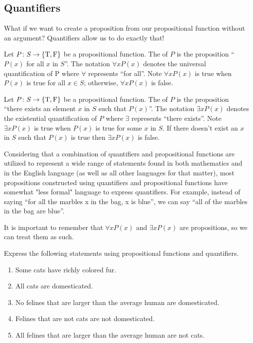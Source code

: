 \documentclass[../main.tex]{subfiles}
\begin{document}
\subsection{Quantifiers}
What if we want to create a proposition from our propositional function without an argument? {Quantifiers} allow us to do exactly that!
\begin{definition}
    Let $P\colon S \rightarrow \{\text T,\text F\}$ be a propositional function. The  of $P$ is the proposition ``$P(x)$ for all $x $ in $S$''. The notation $\forall xP(x)$ denotes the universal quantification of P where $\forall$ represents ``for all''. Note $\forall xP(x)$ is true when $P(x)$ is true for all $x \in S$; otherwise, $\forall x P(x)$ is false.
\end{definition}
\begin{definition}
    Let $P\colon S \rightarrow \{\text T,\text F\}$ be a propositional function. The  of $P$ is the proposition ``there exists an element $x$ in $S$ such that $P(x)$''. The notation $\exists x P(x)$ denotes the existential quantification of $P$ where $\exists $ represents ``there exists''. Note $\exists x P(x)$ is true when $P(x)$ is true for some $x$ in $S$. If there doesn't exist an $x$ in $S$ such that $P(x)$ is true then $\exists x P(x)$ is false.
\end{definition}
\begin{remark}
    Considering that a combination of quantifiers and propositional functions are utilized to represent a wide range of statements found in both mathematics and in the English language (as well as all other languages for that matter), most propositions constructed using quantifiers and propositional functions have somewhat "less formal" language to express quantifiers. For example, instead of saying ``for all the marbles x in the bag, x is blue'', we can say ``all of the marbles in the bag are blue''. 
\end{remark}
It is important to remember that $\forall x P(x)$ and $\exists x P(x)$ are propositions, so we can treat them as such.
\begin{example}
    Express the following statements using propositional functions and quantifiers.
    \begin{enumerate}[label=(\alph*)]
        \item Some cats have richly colored fur. 
        \item All cats are domesticated. 
        \item No felines that are larger than the average human are domesticated.
        \item Felines that are not cats are not domesticated.
        \item All felines that are larger than the average human are not cats.
    \end{enumerate}
\end{example}
\end{document}
